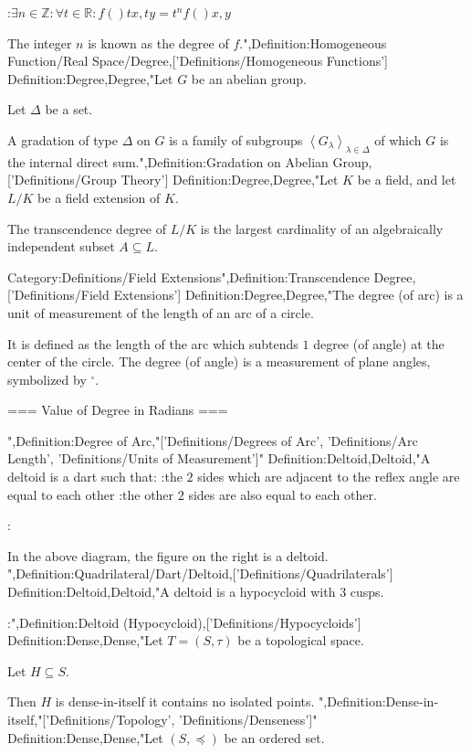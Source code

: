 :$\exists n \in \mathbb Z: \forall t \in \mathbb R: f \left(   \right){t x, t y} = t^n f \left(   \right){x, y}$


The integer $n$ is known as the degree of $f$.",Definition:Homogeneous Function/Real Space/Degree,['Definitions/Homogeneous Functions']
Definition:Degree,Degree,"Let $G$ be an abelian group.

Let $\Delta$ be a set.


A gradation of type $\Delta$ on $G$ is a family of subgroups $\left\langle G_\lambda \right\rangle_{\lambda \mathop \in \Delta}$ of which $G$ is the internal direct sum.",Definition:Gradation on Abelian Group,['Definitions/Group Theory']
Definition:Degree,Degree,"Let $K$ be a field, and let $L/K$ be a field extension of $K$.

The transcendence degree of $L/K$ is the largest cardinality of an algebraically independent subset $A \subseteq L$.

Category:Definitions/Field Extensions",Definition:Transcendence Degree,['Definitions/Field Extensions']
Definition:Degree,Degree,"The degree (of arc) is a unit of measurement of the length of an arc of a circle.

It is defined as the length of the arc which subtends $1$ degree (of angle) at the center of the circle.
The degree (of angle) is a measurement of plane angles, symbolized by $^\circ$.









=== Value of Degree in Radians ===

",Definition:Degree of Arc,"['Definitions/Degrees of Arc', 'Definitions/Arc Length', 'Definitions/Units of Measurement']"
Definition:Deltoid,Deltoid,"A deltoid is a dart such that:
:the $2$ sides which are adjacent to the reflex angle are equal to each other
:the other $2$ sides are also equal to each other.


:

In the above diagram, the figure on the right is a deltoid.
",Definition:Quadrilateral/Dart/Deltoid,['Definitions/Quadrilaterals']
Definition:Deltoid,Deltoid,"A deltoid is a hypocycloid with $3$ cusps.


:",Definition:Deltoid (Hypocycloid),['Definitions/Hypocycloids']
Definition:Dense,Dense,"Let $T = \left( S, \tau \right)$ be a topological space.

Let $H \subseteq S$.


Then $H$ is dense-in-itself  it contains no isolated points.
",Definition:Dense-in-itself,"['Definitions/Topology', 'Definitions/Denseness']"
Definition:Dense,Dense,"Let $\left( S, \preceq \right)$ be an ordered set.


